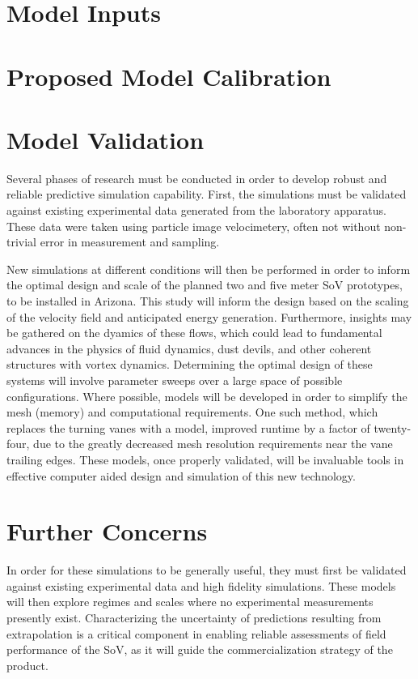 \documentclass{article}
\begin{document}
%
%
%
\section{Model Inputs}


%
%
%
\section{Proposed Model Calibration}


%
%
%
\section{Model Validation}

Several phases of research must be conducted in order to develop robust
and reliable predictive simulation capability. First, the simulations
must be validated against existing experimental data generated from the
laboratory apparatus. These data were taken using particle image
velocimetery, often not without non-trivial error in measurement and
sampling. 

New simulations at different conditions will then be performed in order
to inform the optimal design and scale of the planned two and five meter
SoV prototypes, to be installed in Arizona. This study will inform the
design based on the scaling 
of the velocity field and anticipated energy generation. Furthermore,
insights may be gathered on the dyamics of these flows, which could lead
to fundamental advances in the physics of fluid dynamics, dust devils,
and other coherent structures with vortex
dynamics\cite{Mullen1977181,smithleslie,kanak}. Determining the optimal design of
these systems will involve parameter sweeps over a large space of
possible configurations. Where possible, models will be developed in
order to simplify the mesh (memory) and computational requirements. One
such method, which replaces the turning vanes with a model, improved
runtime by a factor of twenty-four, due to the greatly decreased
mesh resolution requirements near the vane trailing edges. These models,
once properly validated, will be invaluable tools in effective computer
aided design and simulation of this new technology. 


%
%
%
\section{Further Concerns}

In order for these simulations to be generally useful, they must first
be validated against existing experimental data and high fidelity
simulations. These models will then explore regimes and scales where no
experimental measurements presently exist. Characterizing the
uncertainty of predictions resulting from extrapolation is a critical
component in enabling reliable assessments of field performance of the
SoV, as it will guide the commercialization strategy of the product.
\end{document}
